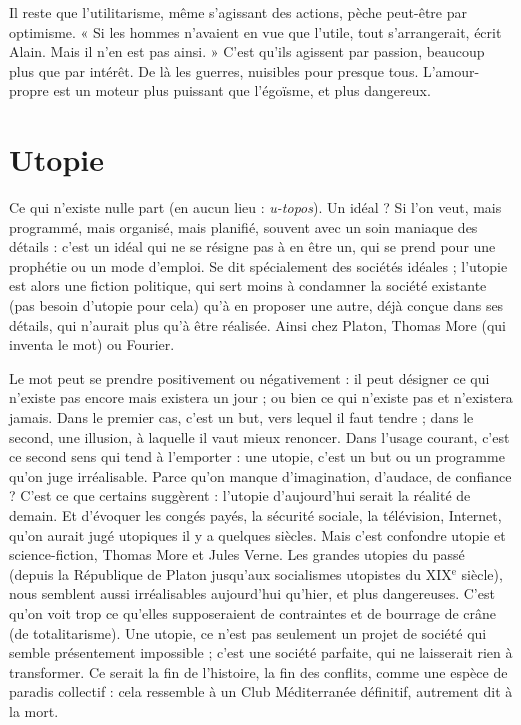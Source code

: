 Il reste que l’utilitarisme, même s'agissant des actions, pèche peut-être par
optimisme. « Si les hommes n’avaient en vue que l’utile, tout s’arrangerait, écrit
Alain. Mais il n’en est pas ainsi. » C’est qu’ils agissent par passion, beaucoup
plus que par intérêt. De là les guerres, nuisibles pour presque tous. L’amour-propre
est un moteur plus puissant que l’égoïsme, et plus dangereux.

\section{Utopie}
Ce qui n’existe nulle part (en aucun lieu : {\it u-topos}). Un idéal ? Si
l’on veut, mais programmé, mais organisé, mais planifié, souvent
avec un soin maniaque des détails : c’est un idéal qui ne se résigne pas à en être
un, qui se prend pour une prophétie ou un mode d’emploi. Se dit spécialement
des sociétés idéales ; l’utopie est alors une fiction politique, qui sert moins à
condamner la société existante (pas besoin d’utopie pour cela) qu’à en proposer
une autre, déjà conçue dans ses détails, qui n’aurait plus qu’à être réalisée. Ainsi
chez Platon, Thomas More (qui inventa le mot) ou Fourier.

Le mot peut se prendre positivement ou négativement : il peut désigner ce
qui n’existe pas encore mais existera un jour ; ou bien ce qui n’existe pas et
n’existera jamais. Dans le premier cas, c’est un but, vers lequel il faut tendre ;
dans le second, une illusion, à laquelle il vaut mieux renoncer. Dans l’usage
courant, c’est ce second sens qui tend à l'emporter : une utopie, c’est un but ou
un programme qu'on juge irréalisable. Parce qu’on manque d’imagination,
d’audace, de confiance ? C’est ce que certains suggèrent : l'utopie d’aujourd’hui
serait la réalité de demain. Et d’évoquer les congés payés, la sécurité sociale, la
télévision, Internet, qu’on aurait jugé utopiques il y a quelques siècles. Mais
c’est confondre utopie et science-fiction, Thomas More et Jules Verne. Les
grandes utopies du passé (depuis la République de Platon jusqu’aux socialismes
utopistes du {\footnotesize XIX$^\text{e}$} siècle), nous semblent aussi irréalisables aujourd’hui qu’hier,
et plus dangereuses. C’est qu’on voit trop ce qu’elles supposeraient de
contraintes et de bourrage de crâne (de totalitarisme). Une utopie, ce n’est pas
seulement un projet de société qui semble présentement impossible ; c’est une
société parfaite, qui ne laisserait rien à transformer. Ce serait la fin de l’histoire,
la fin des conflits, comme une espèce de paradis collectif : cela ressemble à un
Club Méditerranée définitif, autrement dit à la mort.

